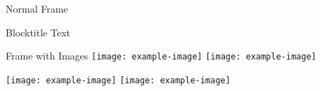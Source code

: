 \documentclass[xcolor={table}]{beamer}
\begin{document}
\begin{frame}{Normal Frame}
    \begin{block}{Blocktitle}
    Text
  \end{block}
\end{frame}

\begingroup
    \begin{frame}[plain]{Frame with Images}
        \centering
        \texttt{[image: example-image]}%
        \texttt{[image: example-image]}

        \texttt{[image: example-image]}%
        \texttt{[image: example-image]}
    \end{frame}
\endgroup
\end{document}
